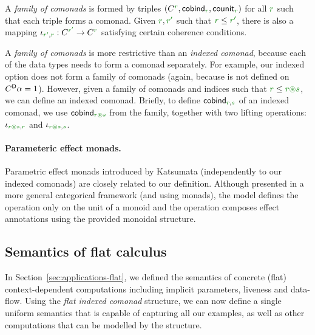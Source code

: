 \begin{definition}
\label{def:flat-family}
A \emph{family of comonads} is formed by triples $(\ctyp{\cclrd{r}}{}, \ident{cobind}_{\cclrd{r}}, 
  \ident{counit}_{\cclrd{r}})$ for all $\cclrd{r}$ such that each triple forms a comonad. Given 
$\cclrd{r}, \cclrd{r'}$ such that $\cclrd{r} \leq \cclrd{r'}$, there is also a mapping 
$\iota_{\cclrd{r'}, \cclrd{r}} : \ctyp{\cclrd{r'}}{} \rightarrow \ctyp{\cclrd{r}}{}$ satisfying
certain coherence conditions.
\end{definition}

\noindent
A \emph{family of comonads} is more restrictive than an \emph{indexed comonad}, because each of the data 
types needs to form a comonad separately. For example, our indexed option does not form a family of 
comonads (again, because  is not defined on $C^{\textnormal{\sffamily D}}\alpha=1$). However, given 
a family of comonads and indices such that $\cclrd{r} \leq \cclrd{r}\cseq\cclrd{s}$, we can define 
an indexed comonad. Briefly, to define $\ident{cobind}_{\cclrd{r},\cclrd{s}}$ of an indexed comonad, 
we use $\ident{cobind}_{\cclrd{r}\cseq\cclrd{s}}$ from the family, together with two lifting operations:
$\iota_{\cclrd{r}\cseq\cclrd{s}, \cclrd{r}}$ and $\iota_{\cclrd{r}\cseq\cclrd{s}, \cclrd{s}}$.

\paragraph{Parameteric effect monads.}
Parametric effect monads introduced by Katsumata \cite{monads-parametric} (independently to our 
indexed comonads) are closely related to our definition.  Although presented in a more general 
categorical framework (and using monads), the model defines the  operation only on the 
unit of a monoid and the  operation composes effect annotations using the provided monoidal 
structure.


\subsection{Semantics of flat calculus}
\label{sec:flat-semantics-calculus}

In Section~\ref{sec:applications-flat}, we defined the semantics of concrete (flat) context-dependent
computations including implicit parameters, liveness and data-flow. Using the \emph{flat indexed 
comonad} structure, we can now define a single uniform semantics that is capable of capturing all 
our examples, as well as other computations that can be modelled by the structure.

